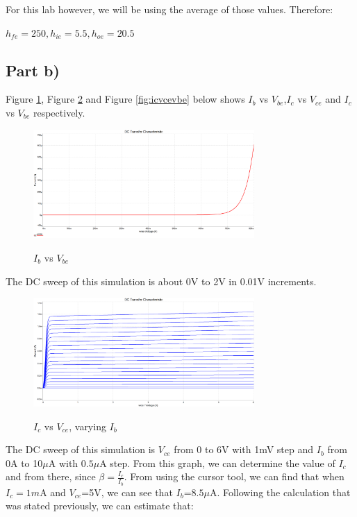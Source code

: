 \documentclass[12pt]{article}
\begin{document}
For this lab however, we will be using the average of those values. Therefore:
\begin{center}
$h_{fe} =250, h_{ie} = 5.5 , h_{oe} = 20.5$
\end{center}

\subsection{Part b)}

Figure \ref{fig:ibvbeib}, Figure \ref{fig:icvceib} and Figure \ref{fig:icvcevbe} below shows $I_b$ vs $V_{be}$,$I_c$ vs $V_{ce}$ and $I_c$ vs $V_{be}$ respectively.
\begin{figure}[H]
\centering
\includegraphics[width=0.75\textwidth]{Images/Ib_vs_Vbe.png}\\
\caption{$I_b$ vs $V_{be}$}
\label{fig:ibvbeib}
\end{figure}
The DC sweep of this simulation is about 0V to 2V in 0.01V increments.
\begin{figure}[H]
\centering
\includegraphics[width=0.75\textwidth]{Images/Ic_vs_Vce.png}\\
\caption{$I_c$ vs $V_{ce}$, varying $I_b$}
\label{fig:icvceib}
\end{figure}
The DC sweep of this simulation is $V_{ce}$ from 0 to 6V with 1mV step and $I_b$ from 0A to 10$\mu$A with $0.5\mu$A step. From this graph, we can determine the value of $I_c$ and from there, since $\beta= \frac{I_c}{I_b}$. From using the cursor tool, we can find that when $I_c=1m$A and $V_{ce}$=5V, we can see that $I_b$=$8.5\mu$A. Following the calculation that was stated previously, we can estimate that:
\end{document}
